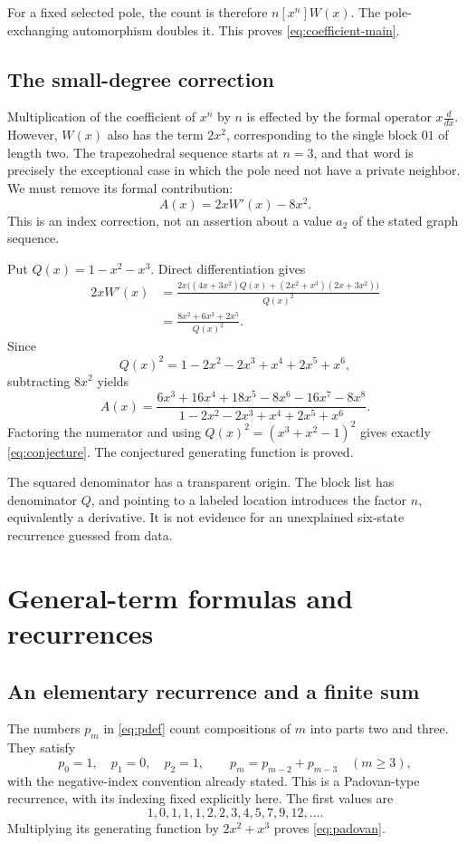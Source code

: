 \documentclass[11pt,letterpaper]{article}
\numberwithin{equation}{section}
\theoremstyle{definition}
\theoremstyle{remark}
\begin{document}
For a fixed selected pole, the count is therefore $n[x^n]W(x)$.
The pole-exchanging automorphism doubles it. This proves
\eqref{eq:coefficient-main}.

\subsection{The small-degree correction}
Multiplication of the coefficient of $x^n$ by $n$ is effected by the
formal operator $x\frac{d}{dx}$. However, $W(x)$ also has the term
$2x^2$, corresponding to the single block $01$ of length two. The
trapezohedral sequence starts at $n=3$, and that word is precisely
the exceptional case in which the pole need not have a private
neighbor. We must remove its formal contribution:
\begin{equation}\label{eq:derivative}
 A(x)=2xW'(x)-8x^2.
\end{equation}
This is an index correction, not an assertion about a value $a_2$
of the stated graph sequence.

Put $Q(x)=1-x^2-x^3$. Direct differentiation gives
\begin{align*}
 2xW'(x)
 &=\frac{2x\bigl((4x+3x^2)Q(x)
                +(2x^2+x^3)(2x+3x^2)\bigr)}{Q(x)^2}\\
 &=\frac{8x^2+6x^3+2x^5}{Q(x)^2}.
\end{align*}
Since
\[
 Q(x)^2=1-2x^2-2x^3+x^4+2x^5+x^6,
\]
subtracting $8x^2$ yields
\begin{equation}\label{eq:gfexpanded}
 A(x)=\frac{6x^3+16x^4+18x^5-8x^6-16x^7-8x^8}
 {1-2x^2-2x^3+x^4+2x^5+x^6}.
\end{equation}
Factoring the numerator and using $Q(x)^2=(x^3+x^2-1)^2$ gives
exactly \eqref{eq:conjecture}. The conjectured generating function
is proved.

The squared denominator has a transparent origin. The block list
has denominator $Q$, and pointing to a labeled location introduces
the factor $n$, equivalently a derivative. It is not evidence for
an unexplained six-state recurrence guessed from data.

\section{General-term formulas and recurrences}

\subsection{An elementary recurrence and a finite sum}
The numbers $p_m$ in \eqref{eq:pdef} count compositions of $m$ into
parts two and three. They satisfy
\begin{equation}\label{eq:prec}
 p_0=1,\quad p_1=0,\quad p_2=1,\qquad
 p_m=p_{m-2}+p_{m-3}\quad(m\ge3),
\end{equation}
with the negative-index convention already stated. This is a
Padovan-type recurrence, with its indexing fixed explicitly here.
The first values are
\[
 1,0,1,1,1,2,2,3,4,5,7,9,12,\ldots.
\]
Multiplying its generating function by $2x^2+x^3$ proves
\eqref{eq:padovan}.
\end{document}
